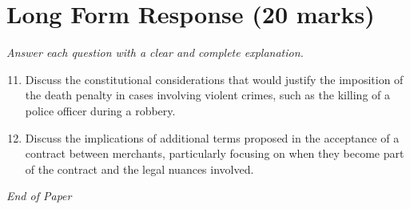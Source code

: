 \documentclass[12pt]{article}
\begin{document}
\section*{Long Form Response (20 marks)}
\textit{Answer each question with a clear and complete explanation.}
\begin{enumerate}[label=\arabic*.]
\setcounter{enumi}{10}
\item Discuss the constitutional considerations that would justify the imposition of the death penalty in cases involving violent crimes, such as the killing of a police officer during a robbery.
\item Discuss the implications of additional terms proposed in the acceptance of a contract between merchants, particularly focusing on when they become part of the contract and the legal nuances involved.
\end{enumerate}

\vfill
\noindent\textit{End of Paper}
\end{document}
